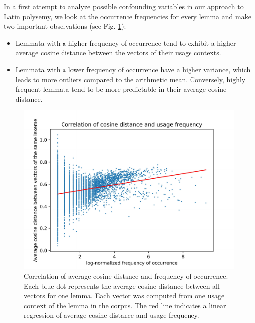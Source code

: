 \documentclass[oneside]{book}
\begin{document}
In a first attempt to analyze possible confounding variables in our approach to Latin polysemy, we look at the occurrence frequencies for every lemma and make two important observations (see Fig. \ref{figure:cosineDistanceVsFrequency}):
\begin{itemize}
	\item Lemmata with a higher frequency of occurrence tend to exhibit a higher average cosine distance between the vectors of their usage contexts.
	\label{firstObservation}
	\item Lemmata with a lower frequency of occurrence have a higher variance, which leads to more outliers compared to the arithmetic mean. Conversely, highly frequent lemmata tend to be more predictable in their average cosine distance.
\end{itemize}
\begin{figure}[ht]
	\includegraphics[width=\linewidth]{cos_dist_vs_freq}
	\caption{Correlation of average cosine distance and frequency of occurrence. Each blue dot represents the average cosine distance between all vectors for one lemma. Each vector was computed from one usage context of the lemma in the corpus. The red line indicates a linear regression of average cosine distance and usage frequency.}
	\label{figure:cosineDistanceVsFrequency}
\end{figure}
\end{document}
